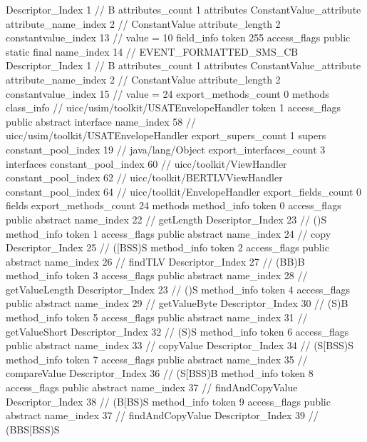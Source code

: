 {{{{{				Descriptor_Index	1		// B
				attributes_count	1
				attributes {
				ConstantValue_attribute {
					attribute_name_index	2		// ConstantValue
					attribute_length	2
					constantvalue_index	13		// value = 10
				}
				}
			}
			field_info {
				token	255
				access_flags	public static final
				name_index	14		// EVENT_FORMATTED_SMS_CB
				Descriptor_Index	1		// B
				attributes_count	1
				attributes {
				ConstantValue_attribute {
					attribute_name_index	2		// ConstantValue
					attribute_length	2
					constantvalue_index	15		// value = 24
				}
				}
			}
			}
			export_methods_count	0
			methods {
			}
		}
		class_info {		// uicc/usim/toolkit/USATEnvelopeHandler
			token	1
			access_flags	public abstract interface
			name_index	58		// uicc/usim/toolkit/USATEnvelopeHandler
			export_supers_count	1
			supers {
				constant_pool_index	19		// java/lang/Object
			}
			export_interfaces_count	3
			interfaces {
				constant_pool_index	60		// uicc/toolkit/ViewHandler
				constant_pool_index	62		// uicc/toolkit/BERTLVViewHandler
				constant_pool_index	64		// uicc/toolkit/EnvelopeHandler
			}
			export_fields_count	0
			fields {
			}
			export_methods_count	24
			methods {
				method_info {
					token	0
					access_flags	public abstract
					name_index	22		// getLength
					Descriptor_Index	23		// ()S
				}
				method_info {
					token	1
					access_flags	public abstract
					name_index	24		// copy
					Descriptor_Index	25		// ([BSS)S
				}
				method_info {
					token	2
					access_flags	public abstract
					name_index	26		// findTLV
					Descriptor_Index	27		// (BB)B
				}
				method_info {
					token	3
					access_flags	public abstract
					name_index	28		// getValueLength
					Descriptor_Index	23		// ()S
				}
				method_info {
					token	4
					access_flags	public abstract
					name_index	29		// getValueByte
					Descriptor_Index	30		// (S)B
				}
				method_info {
					token	5
					access_flags	public abstract
					name_index	31		// getValueShort
					Descriptor_Index	32		// (S)S
				}
				method_info {
					token	6
					access_flags	public abstract
					name_index	33		// copyValue
					Descriptor_Index	34		// (S[BSS)S
				}
				method_info {
					token	7
					access_flags	public abstract
					name_index	35		// compareValue
					Descriptor_Index	36		// (S[BSS)B
				}
				method_info {
					token	8
					access_flags	public abstract
					name_index	37		// findAndCopyValue
					Descriptor_Index	38		// (B[BS)S
				}
				method_info {
					token	9
					access_flags	public abstract
					name_index	37		// findAndCopyValue
					Descriptor_Index	39		// (BBS[BSS)S
}}}}}
